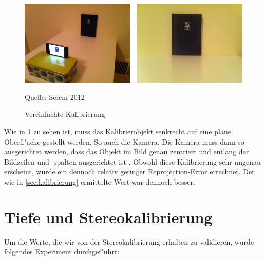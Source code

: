 \begin{figure}[H]
	\includegraphics[scale=1.0]{bilder/simple_calib}
	\caption[Vereinfachte Kalibrierung]{Vereinfachte Kalibrierung}
	\small Quelle: Solem 2012
	\label{fig:simplecalib}%
\end{figure}

\noindent Wie in \ref{fig:simplecalib} zu sehen ist, muss das Kalibrierobjekt senkrecht auf eine plane Oberfl"ache gestellt werden. So auch die Kamera. Die Kamera muss dann so ausgerichtet werden, dass das Objekt im Bild genau zentriert und entlang der Bildzeilen und -spalten ausgerichtet ist \cite{CVF}.\newline
Obwohl diese Kalibrierung sehr ungenau erscheint, wurde ein dennoch relativ geringer Reprojection-Error errechnet. Der wie in \ref{sec:kalibrierung} ermittelte Wert war dennoch besser.

\section{Tiefe und Stereokalibrierung}
\label{sec:stereovalid}

Um die Werte, die wir von der Stereokalibrierung erhalten zu validieren, wurde folgendes Experiment durchgef"uhrt:

